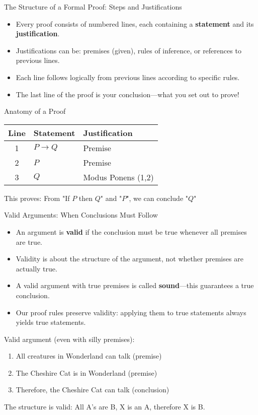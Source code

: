 \documentclass{beamer}
\begin{document}
	\begin{frame}{The Structure of a Formal Proof: Steps and Justifications}
		\begin{itemize}
			\item Every proof consists of numbered lines, each containing a \textbf{statement} and its \textbf{justification}.
			\item Justifications can be: premises (given), rules of inference, or references to previous lines.
			\item Each line follows logically from previous lines according to specific rules.
			\item The last line of the proof is your conclusion—what you set out to prove!
		\end{itemize}
		
		\begin{block}{Anatomy of a Proof}
			\begin{tabular}{|c|l|l|}
				\hline
				\textbf{Line} & \textbf{Statement} & \textbf{Justification} \\
				\hline
				1 & $P \rightarrow Q$ & Premise \\
				2 & $P$ & Premise \\
				3 & $Q$ & Modus Ponens (1,2) \\
				\hline
			\end{tabular}
			
			This proves: From "If $P$ then $Q$" and "$P$", we can conclude "$Q$"
		\end{block}
	\end{frame}
	
	\begin{frame}{Valid Arguments: When Conclusions Must Follow}
		\begin{itemize}
			\item An argument is \textbf{valid} if the conclusion must be true whenever all premises are true.
			\item Validity is about the structure of the argument, not whether premises are actually true.
			\item A valid argument with true premises is called \textbf{sound}—this guarantees a true conclusion.
			\item Our proof rules preserve validity: applying them to true statements always yields true statements.
		\end{itemize}
		
		\begin{example}
			Valid argument (even with silly premises):
			\begin{enumerate}
				\item All creatures in Wonderland can talk (premise)
				\item The Cheshire Cat is in Wonderland (premise)
				\item Therefore, the Cheshire Cat can talk (conclusion)
			\end{enumerate}
			The structure is valid: All A's are B, X is an A, therefore X is B.
		\end{example}
	\end{frame}
	
\end{document}

